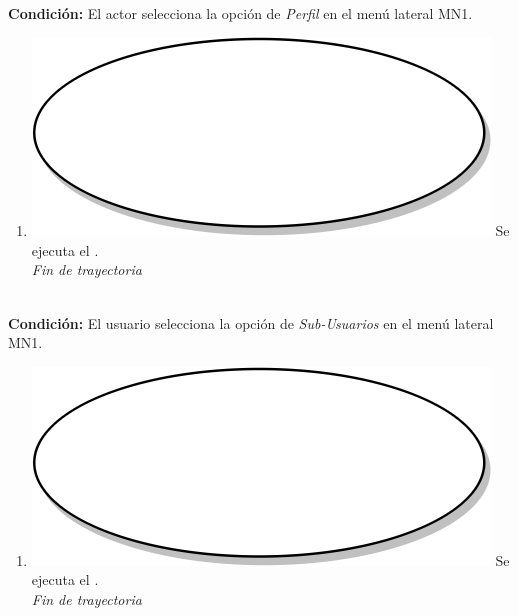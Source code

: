 \textbf{} \\
\textbf{Condición:} El actor selecciona la opción de \textit{Perfil} en el menú lateral MN1. \\
 \begin{enumerate}[label=E\arabic*]
    \item {\includegraphics[scale=.05]{Capitulo3/img/proceso.png} Se ejecuta el \textbf{}.} \\
    \textit{Fin de trayectoria} \\
\end{enumerate}

\textbf{} \\
\textbf{Condición:} El usuario selecciona la opción de \textit{Sub-Usuarios} en el menú lateral MN1. \\
 \begin{enumerate}[label=F\arabic*]
    \item {\includegraphics[scale=.05]{Capitulo3/img/proceso.png} Se ejecuta el \textbf{}.} \\
    \textit{Fin de trayectoria} \\
\end{enumerate}

